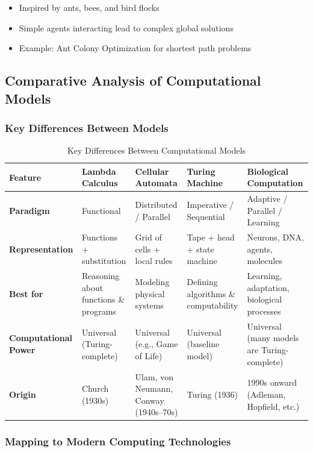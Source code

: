 \begin{itemize}
\item Inspired by ants, bees, and bird flocks
\item Simple agents interacting lead to complex global solutions
\item Example: Ant Colony Optimization for shortest path problems
\end{itemize}

\subsection{Comparative Analysis of Computational Models}

\subsubsection{Key Differences Between Models}

\begin{table}[h!]
\centering
\scriptsize
\begin{tabular}{|l|l|l|l|l|}
\hline
\textbf{Feature} & \textbf{Lambda Calculus} & \textbf{Cellular Automata} & \textbf{Turing Machine} & \textbf{Biological Computation} \\
\hline
\textbf{Paradigm} & Functional & Distributed / Parallel & Imperative / Sequential & Adaptive / Parallel / Learning \\
\hline
\textbf{Representation} & Functions + substitution & Grid of cells + local rules & Tape + head + state machine & Neurons, DNA, agents, molecules \\
\hline
\textbf{Best for} & Reasoning about functions \& programs & Modeling physical systems & Defining algorithms \& computability & Learning, adaptation, biological processes \\
\hline
\textbf{Computational Power} & Universal (Turing-complete) & Universal (e.g., Game of Life) & Universal (baseline model) & Universal (many models are Turing-complete) \\
\hline
\textbf{Origin} & Church (1930s) & Ulam, von Neumann, Conway (1940s–70s) & Turing (1936) & 1990s onward (Adleman, Hopfield, etc.) \\
\hline
\end{tabular}
\caption{Key Differences Between Computational Models}
\end{table}

\subsubsection{Mapping to Modern Computing Technologies}

